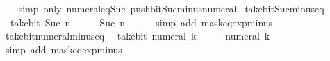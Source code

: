 \begin{isabellebody}
%
\isadelimproof
\ \ %
\endisadelimproof
%
\isatagproof
{}\isamarkupfalse%
\ {\isacharparenleft}{\kern0pt}simp\ only{\isacharcolon}{\kern0pt}\ numeral{\isacharunderscore}{\kern0pt}eq{\isacharunderscore}{\kern0pt}Suc\ push{\isacharunderscore}{\kern0pt}bit{\isacharunderscore}{\kern0pt}Suc{\isacharunderscore}{\kern0pt}minus{\isacharunderscore}{\kern0pt}numeral{\isacharparenright}{\kern0pt}%
\endisatagproof
{\isafoldproof}%
%
\isadelimproof
\isanewline
%
\endisadelimproof
\isanewline
{}\isamarkupfalse%
\ take{\isacharunderscore}{\kern0pt}bit{\isacharunderscore}{\kern0pt}Suc{\isacharunderscore}{\kern0pt}minus{\isacharunderscore}{\kern0pt}{}{\isacharunderscore}{\kern0pt}eq{\isacharcolon}{\kern0pt}\isanewline
\ \ {\isacartoucheopen}take{\isacharunderscore}{\kern0pt}bit\ {\isacharparenleft}{\kern0pt}Suc\ n{\isacharparenright}{\kern0pt}\ {\isacharparenleft}{\kern0pt}{\isacharminus}{\kern0pt}\ {}{\isacharparenright}{\kern0pt}\ {\isacharequal}{\kern0pt}\ {}\ {\isacharcircum}{\kern0pt}\ Suc\ n\ {\isacharminus}{\kern0pt}\ {}{\isacartoucheclose}\isanewline
%
\isadelimproof
\ \ %
\endisadelimproof
%
\isatagproof
{}\isamarkupfalse%
\ {\isacharparenleft}{\kern0pt}simp\ add{\isacharcolon}{\kern0pt}\ mask{\isacharunderscore}{\kern0pt}eq{\isacharunderscore}{\kern0pt}exp{\isacharunderscore}{\kern0pt}minus{\isacharunderscore}{\kern0pt}{}{\isacharparenright}{\kern0pt}%
\endisatagproof
{\isafoldproof}%
%
\isadelimproof
\isanewline
%
\endisadelimproof
\isanewline
{}\isamarkupfalse%
\ take{\isacharunderscore}{\kern0pt}bit{\isacharunderscore}{\kern0pt}numeral{\isacharunderscore}{\kern0pt}minus{\isacharunderscore}{\kern0pt}{}{\isacharunderscore}{\kern0pt}eq{\isacharcolon}{\kern0pt}\isanewline
\ \ {\isacartoucheopen}take{\isacharunderscore}{\kern0pt}bit\ {\isacharparenleft}{\kern0pt}numeral\ k{\isacharparenright}{\kern0pt}\ {\isacharparenleft}{\kern0pt}{\isacharminus}{\kern0pt}\ {}{\isacharparenright}{\kern0pt}\ {\isacharequal}{\kern0pt}\ {}\ {\isacharcircum}{\kern0pt}\ numeral\ k\ {\isacharminus}{\kern0pt}\ {}{\isacartoucheclose}\isanewline
%
\isadelimproof
\ \ %
\endisadelimproof
%
\isatagproof
{}\isamarkupfalse%
\ {\isacharparenleft}{\kern0pt}simp\ add{\isacharcolon}{\kern0pt}\ mask{\isacharunderscore}{\kern0pt}eq{\isacharunderscore}{\kern0pt}exp{\isacharunderscore}{\kern0pt}minus{\isacharunderscore}{\kern0pt}{}{\isacharparenright}{\kern0pt}%
\endisatagproof
{\isafoldproof}%
%
\isadelimproof

\end{isabellebody}
